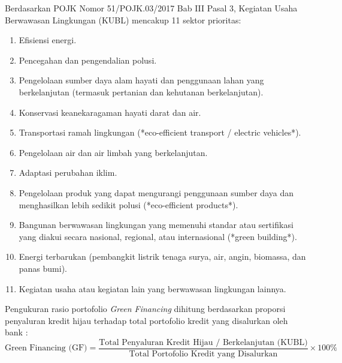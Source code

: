 \documentclass[12pt,a4paper]{article}
\numberwithin{equation}{section}
\begin{document}
\noindent
Berdasarkan POJK Nomor 51/POJK.03/2017 Bab III Pasal 3, Kegiatan Usaha Berwawasan Lingkungan (KUBL) mencakup 11 sektor prioritas:
\begin{enumerate}
  \item Efisiensi energi.
  \item Pencegahan dan pengendalian polusi.
  \item Pengelolaan sumber daya alam hayati dan penggunaan lahan yang berkelanjutan (termasuk pertanian dan kehutanan berkelanjutan).
  \item Konservasi keanekaragaman hayati darat dan air.
  \item Transportasi ramah lingkungan (*eco-efficient transport / electric vehicles*).
  \item Pengelolaan air dan air limbah yang berkelanjutan.
  \item Adaptasi perubahan iklim.
  \item Pengelolaan produk yang dapat mengurangi penggunaan sumber daya dan menghasilkan lebih sedikit polusi (*eco-efficient products*).
  \item Bangunan berwawasan lingkungan yang memenuhi standar atau sertifikasi yang diakui secara nasional, regional, atau internasional (*green building*).
  \item Energi terbarukan (pembangkit listrik tenaga surya, air, angin, biomassa, dan panas bumi).
  \item Kegiatan usaha atau kegiatan lain yang berwawasan lingkungan lainnya.
\end{enumerate}

\noindent
Pengukuran rasio portofolio \emph{Green Financing} dihitung berdasarkan proporsi penyaluran kredit hijau terhadap total portofolio kredit yang disalurkan oleh bank \citep{Pramono2022, Sun2021}:
\begin{equation}
  \text{Green Financing (GF)} = \frac{\text{Total Penyaluran Kredit Hijau / Berkelanjutan (KUBL)}}{\text{Total Portofolio Kredit yang Disalurkan}} \times 100\%
\end{equation}
\end{document}
